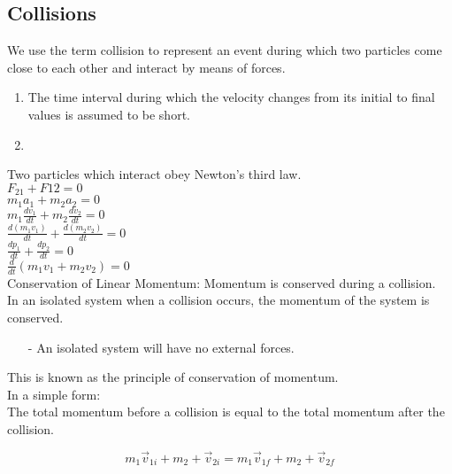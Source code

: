 \documentclass[]{article}
\begin{document}
\subsection*{Collisions}
We use the term collision to represent an event during which two particles come close to each other and interact by means of forces.\\
\begin{enumerate}
    \item The time interval during which the velocity changes from its initial to final values is assumed to be short.
    \item 
\end{enumerate}
Two particles which interact obey Newton's third law.\\
$F_{21} + F{12} = 0$\\
$m_1a_1 + m_2a_2 = 0$\\
$m_1 \frac{dv_1}{dt} + m_2 \frac{dv_2}{dt} = 0$\\
$\frac{d(m_1v_1)}{dt} + \frac{d(m_2v_2)}{dt} = 0$\\
$\frac{dp_1}{dt} + \frac{dp_2}{dt} = 0$\\
$\frac{d}{dt}(m_1v_1+m_2v_2) = 0$\\
Conservation of Linear Momentum: Momentum is conserved during a collision.\\
In an isolated system when a collision occurs, the momentum of the system is conserved.\\
\begin{enumerate}
    \item[-] An isolated system will have no external forces.
\end{enumerate}

This is known as the principle of conservation of momentum.\\
In a simple form:\\
The total momentum before a collision is equal to the total momentum after the collision.


\begin{equation*}
    m_{1}\vec{v}_{1i} + m_{2}+\vec{v}_{2i} = m_{1}\vec{v}_{1f } + m_{2}+\vec{v}_{2f}
\end{equation*}
\end{document}
